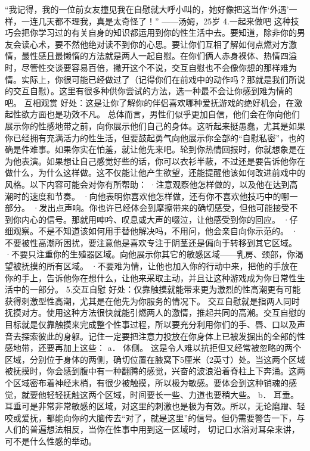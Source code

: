 \documentclass[12pt,UTF8]{ctexbook}
\begin{document}
“我记得，我的一位前女友撞见我在自慰就大呼小叫的，她好像把这当作‘外遇’一样，一连几天都不理我，真是太奇怪了！”
——汤姆，25岁
4.一起来做吧
这种技巧会把你学习过的有关自身的知识都运用到你的性生活中去。要知道，除非你的男友会读心术，要不然他绝对读不到你的心思。要让你们互相了解如何点燃对方激情，最性感且最懒惰的方法就是两人一起自慰。在你们俩人赤身裸体、热情四溢时，尽管性交谈要容易百倍，撇开这个不说，交互自慰也不会像你想的那样难为情。实际上，你很可能已经做过了（记得你们在前戏中的动作吗？那就是我们所说的交互自慰）。这里有很多种供你尝试的方法，选一种最不会让你感到难为情的吧。
互相观赏
好处：这是让你了解你的伴侣喜欢哪种爱抚游戏的绝好机会，在激起性欲方面也是功效不凡。
总体而言，男性们似乎更加自信，他们会在你向他们展示你的性感地带之前，向你展示他们自己的身体。这听起来挺愚蠢，尤其是如果你已经拥有充满活力的性生活，但要鼓起勇气向他展示你全部的“自慰私密”，也的确是件难事。如果你实在怕羞，就让他先来吧。轮到你热情回报时，你就想象是在为他表演。如果想让自己感觉好些的话，你可以衣衫半蔽，不过还是要告诉他你在做什么，为什么这样做。这不仅能让他产生欲望，还能提醒他该如何改进前戏中的风格。以下内容可能会对你有所帮助：
·注意观察他怎样做的，以及他在达到高潮时的速度和节奏。
·向他表明你喜欢他怎样做，还有你不喜欢他技巧中的哪一部分。
·发出点声响。你也许已经体会到摩擦带来的确切感受，但他可能接受不到你内心的信号。那就用呻吟、叹息或大声的啜泣，让他感受到你的回应。
·仔细观察。不是不知道该如何用手替他解决吗，不用问，他会亲自向你示范的。
·不要被性高潮所困扰，要注意他是喜欢专注于阴茎还是偏向于转移到其它区域。
·不要只注重你的生殖器区域。向他展示你其它的敏感区域——乳房、颈部，你渴望被抚摸的所有区域。
·不要难为情，让他也加入你的行动中来，把他的手放在你的手上，告诉他你在想什么，让他来采取主动，并且让这种游戏成为你日常性生活中的一部分。
5.交互自慰
好处：仅靠触摸就能带来更为激烈的性高潮更有可能获得刺激型性高潮，尤其是在他先为你服务的情况下。
交互自慰就是指两人同时抚摸对方。使用这种方法很快就能引燃两人的激情，推起共同的高潮。交互自慰的目标就是仅靠触摸来完成整个性事过程，所以要充分利用你们的手、唇、口以及声音去探索彼此的身躯。记住一定要把注意力投放在你身体上已被发掘出的全部的性感地带，还要再加上这些：
a． 体侧。
这是令人难以抗拒但又经常被忽略的两个区域，分别位于身体的两侧，确切位置在腋窝下5厘米（2英寸）处。当这两个区域被抚摸时，你会感到腹中有一种翻腾的感觉，兴奋的波浪沿着脊柱上下奔涌。这两个区域密布着神经末梢，有很少被触摸，所以极为敏感。要体会到这种销魂的感觉，就要他轻轻抚触这两个区域，时间要长一些、力道也要稍大些。
b． 耳垂。
耳垂可是非常非常敏感的区域，对这里的刺激也是极为有效。所以，无论磨蹭、轻咬或爱抚，都能向你的大脑传去“对了，就是这里”的信号。但仍需要警告一下，与人们的普遍想法相反，当你在性事中用到这一区域时， 切记口水浴对耳朵来讲，可不是什么性感的举动。
\end{document}
